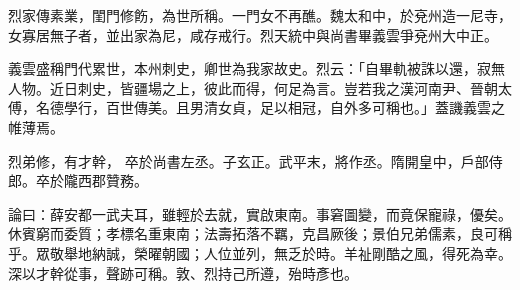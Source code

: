 \begin{pinyinscope}
 烈家傳素業，閨門修飭，為世所稱。一門女不再醮。魏太和中，於兗州造一尼寺，女寡居無子者，並出家為尼，咸存戒行。烈天統中與尚書畢義雲爭兗州大中正。



 義雲盛稱門代累世，本州刺史，卿世為我家故史。烈云：「自畢軌被誅以還，寂無人物。近日刺史，皆疆場之上，彼此而得，何足為言。豈若我之漢河南尹、晉朝太傅，名德學行，百世傳美。且男清女貞，足以相冠，自外多可稱也。」蓋譏義雲之帷薄焉。



 烈弟修，有才幹，
 卒於尚書左丞。子玄正。武平末，將作丞。隋開皇中，戶部侍郎。卒於隴西郡贊務。



 論曰：薛安都一武夫耳，雖輕於去就，實啟東南。事窘圖變，而竟保寵祿，優矣。休賓窮而委質；孝標名重東南；法壽拓落不羈，克昌厥後；景伯兄弟儒素，良可稱乎。眾敬舉地納誠，榮曜朝國；人位並列，無乏於時。羊祉剛酷之風，得死為幸。深以才幹從事，聲跡可稱。敦、烈持己所遵，殆時彥也。



\end{pinyinscope}